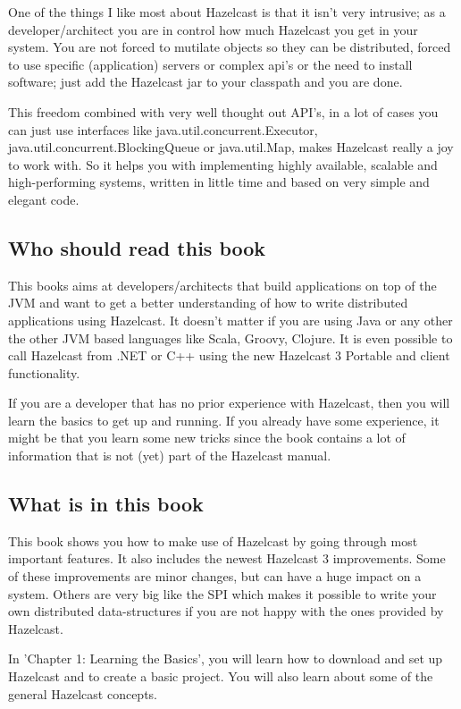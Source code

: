 One of the things I like most about Hazelcast is that it isn't very intrusive; as a developer/architect you are in control how much Hazelcast you get in your system. You are not forced to mutilate objects so they can be distributed, forced to use specific (application) servers or complex api's or the need to install software; just add the Hazelcast jar to your classpath and you are done.

This freedom combined with very well thought out API's, in a lot of cases you can just use interfaces like java.util.concurrent.Executor, java.util.concurrent.BlockingQueue or java.util.Map, makes Hazelcast really a joy to work with. So it helps you with implementing highly available, scalable and high-performing systems, written in little time and based on very simple and elegant code.

\subsection*{Who should read this book}
This books aims at developers/architects that build applications on top of the JVM and want to get a better understanding of how to write distributed applications using Hazelcast. It doesn't matter if you are using Java or any other the other JVM based languages like Scala, Groovy, Clojure. It is even possible to call Hazelcast from .NET or C++ using the new Hazelcast 3 Portable and client functionality.

If you are a developer that has no prior experience with Hazelcast, then you will learn the basics to get up and running. If you already have some experience, it might be that you learn some new tricks since the book contains a lot of information that is not (yet) part of the Hazelcast manual.
 
\subsection*{What is in this book}
This book shows you how to make use of Hazelcast by going through most important features. It also includes the newest Hazelcast 3 improvements. Some of these improvements are minor changes, but can have a huge impact on a system. Others are very big like the SPI which makes it possible to write your own distributed data-structures if you are not happy with the ones provided by Hazelcast.

In 'Chapter 1: Learning the Basics', you will learn how to download and set up Hazelcast and to create a basic project. You will also learn about some of the general Hazelcast concepts.

